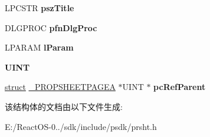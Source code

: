 \begin{DoxyCompactItemize}
\begin{tabbing}
\end{tabbing}\item 
\mbox{\label{struct___p_r_o_p_s_h_e_e_t_p_a_g_e_a_af75a18c7712ce1122a0958d7f44c916a}} 
L\+P\+C\+S\+TR {\bfseries psz\+Title}
\item 
\mbox{\label{struct___p_r_o_p_s_h_e_e_t_p_a_g_e_a_ace678443950403ddfbc199f0568a9b5d}} 
D\+L\+G\+P\+R\+OC {\bfseries pfn\+Dlg\+Proc}
\item 
\mbox{\label{struct___p_r_o_p_s_h_e_e_t_p_a_g_e_a_ac546e5e2cf57d8dffb895fda5982b8af}} 
L\+P\+A\+R\+AM {\bfseries l\+Param}
\item 
\mbox{\label{struct___p_r_o_p_s_h_e_e_t_p_a_g_e_a_a64f82e7f5df715e904249fccdf8ff6ff}} 
{\bfseries U\+I\+NT}
\item 
\mbox{\label{struct___p_r_o_p_s_h_e_e_t_p_a_g_e_a_ac7f60de8f2734655a8410c05e7e5053f}} 
\hyperlink{interfacestruct}{struct} \hyperlink{struct___p_r_o_p_s_h_e_e_t_p_a_g_e_a}{\+\_\+\+P\+R\+O\+P\+S\+H\+E\+E\+T\+P\+A\+G\+EA} $\ast$U\+I\+NT $\ast$ {\bfseries pc\+Ref\+Parent}
\end{DoxyCompactItemize}


该结构体的文档由以下文件生成\+:\begin{DoxyCompactItemize}
\item 
E\+:/\+React\+O\+S-\/0../sdk/include/psdk/prsht.\+h\end{DoxyCompactItemize}
